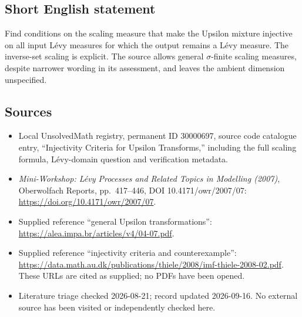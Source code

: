 \documentclass[11pt]{article}
\begin{document}
\subsection{Short English statement}
Find conditions on the scaling measure that make the Upsilon mixture injective on all input L\'evy measures for which the output remains a L\'evy measure. The inverse-set scaling is explicit. The source allows general \(\sigma\)-finite scaling measures, despite narrower wording in its assessment, and leaves the ambient dimension unspecified.
\subsection{Sources}
\begin{itemize}
\item Local UnsolvedMath registry, permanent ID 30000697, source code catalogue entry, ``Injectivity Criteria for Upsilon Transforms,'' including the full scaling formula, L\'evy-domain question and verification metadata.
\item \emph{Mini-Workshop: L\'evy Processes and Related Topics in Modelling (2007)}, Oberwolfach Reports, pp.\ 417--446, DOI 10.4171/owr/2007/07: \url{https://doi.org/10.4171/owr/2007/07}.
\item Supplied reference ``general Upsilon transformations'': \url{https://alea.impa.br/articles/v4/04-07.pdf}.
\item Supplied reference ``injectivity criteria and counterexample'': \url{https://data.math.au.dk/publications/thiele/2008/imf-thiele-2008-02.pdf}. These URLs are cited as supplied; no PDFs have been opened.
\item Literature triage checked 2026-08-21; record updated 2026-09-16. No external source has been visited or independently checked here.
\end{itemize}
\end{document}
